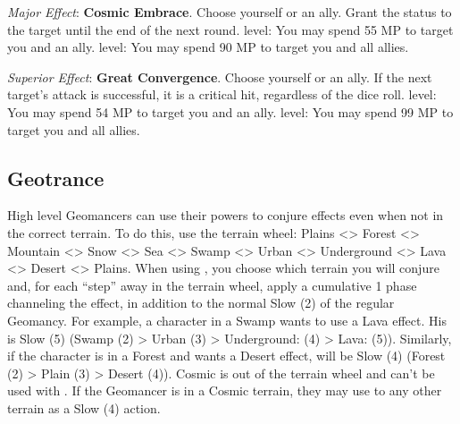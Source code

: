 \begin{multicols}{2}
\textit{Major Effect}: \textbf{Cosmic Embrace}. Choose yourself or an ally. Grant the  status to the target until the end of the next round.  level: You may spend 55 MP to target you and an ally.  level: You may spend 90 MP to target you and all allies.

\textit{Superior Effect}: \textbf{Great Convergence}. Choose yourself or an ally. If the next target’s attack is successful, it is a critical hit, regardless of the dice roll.  level: You may spend 54 MP to target you and an ally.  level: You may spend 99 MP to target you and all allies.

\end{multicols}
 
\subsection*{Geotrance}\label{subsec:geo-trance}

\begin{multicols}{2}


High level Geomancers can use their powers to conjure effects even when not in the correct terrain. To do this, use the terrain wheel: Plains <> Forest <> Mountain <> Snow <> Sea <> Swamp <> Urban <> Underground <> Lava <> Desert <> Plains. When using , you choose which terrain you will conjure and, for each “step” away in the terrain wheel, apply a cumulative 1 phase channeling the effect, in addition to the normal Slow (2) of the regular Geomancy. For example, a character in a Swamp wants to use a Lava effect. His  is Slow (5) (Swamp (2) > Urban (3) > Underground: (4) > Lava: (5)). Similarly, if the character is in a Forest and wants a Desert effect,  will be Slow (4) (Forest (2) > Plain (3) > Desert (4)). Cosmic is out of the terrain wheel and can’t be used with . If the Geomancer is in a Cosmic terrain, they may use  to any other terrain as a Slow (4) action.


\begin{center}
\end{center}
\end{multicols}
